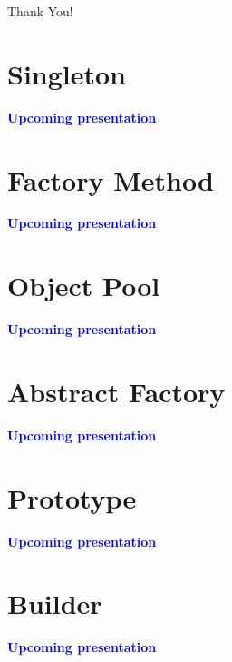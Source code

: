 \documentclass[13pt]{beamer}
\begin{document}
\begin{frame}
\begin{center}
{\fontsize{40}{50}\selectfont Thank You!}
\end{center}
\end{frame}

\section{Singleton}
\begin{frame}
\begin{center}
\textcolor{blue}{\textbf{Upcoming presentation}}
\end{center}
\end{frame}

\section{Factory Method}
\begin{frame}
\begin{center}
\textcolor{blue}{\textbf{Upcoming presentation}}
\end{center}
\end{frame}

\section{Object Pool}
\begin{frame}
\begin{center}
\textcolor{blue}{\textbf{Upcoming presentation}}
\end{center}
\end{frame}

\section{Abstract Factory}
\begin{frame}
\begin{center}
\textcolor{blue}{\textbf{Upcoming presentation}}
\end{center}
\end{frame}

\section{Prototype}
\begin{frame}
\begin{center}
\textcolor{blue}{\textbf{Upcoming presentation}}
\end{center}
\end{frame}

\section{Builder}
\begin{frame}
\begin{center}
\textcolor{blue}{\textbf{Upcoming presentation}}
\end{center}
\end{frame}
\end{document}
